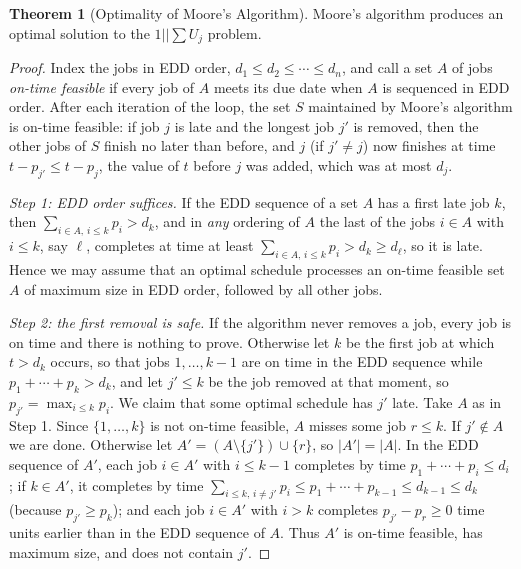 \documentclass{article}
\theoremstyle{definition}
\newtheorem{theorem}{Theorem}
\begin{document}
\begin{theorem}[Optimality of Moore's Algorithm]
Moore's algorithm produces an optimal solution to the $1||\sum U_j$ problem.
\begin{proof}
Index the jobs in EDD order, $d_1 \leq d_2 \leq \cdots \leq d_n$, and call a set $A$ of jobs \emph{on-time feasible} if every job of $A$ meets its due date when $A$ is sequenced in EDD order. After each iteration of the loop, the set $S$ maintained by Moore's algorithm is on-time feasible: if job $j$ is late and the longest job $j'$ is removed, then the other jobs of $S$ finish no later than before, and $j$ (if $j' \neq j$) now finishes at time $t - p_{j'} \leq t - p_j$, the value of $t$ before $j$ was added, which was at most $d_j$.

\emph{Step 1: EDD order suffices.} If the EDD sequence of a set $A$ has a first late job $k$, then $\sum_{i \in A,\, i \leq k} p_i > d_k$, and in \emph{any} ordering of $A$ the last of the jobs $i \in A$ with $i \leq k$, say $\ell$, completes at time at least $\sum_{i \in A,\, i \leq k} p_i > d_k \geq d_\ell$, so it is late. Hence we may assume that an optimal schedule processes an on-time feasible set $A$ of maximum size in EDD order, followed by all other jobs.

\emph{Step 2: the first removal is safe.} If the algorithm never removes a job, every job is on time and there is nothing to prove. Otherwise let $k$ be the first job at which $t > d_k$ occurs, so that jobs $1, \ldots, k-1$ are on time in the EDD sequence while $p_1 + \cdots + p_k > d_k$, and let $j' \leq k$ be the job removed at that moment, so $p_{j'} = \max_{i \leq k} p_i$. We claim that some optimal schedule has $j'$ late. Take $A$ as in Step 1. Since $\{1, \ldots, k\}$ is not on-time feasible, $A$ misses some job $r \leq k$. If $j' \notin A$ we are done. Otherwise let $A' = (A \setminus \{j'\}) \cup \{r\}$, so $|A'| = |A|$. In the EDD sequence of $A'$, each job $i \in A'$ with $i \leq k-1$ completes by time $p_1 + \cdots + p_i \leq d_i$; if $k \in A'$, it completes by time $\sum_{i \leq k,\, i \neq j'} p_i \leq p_1 + \cdots + p_{k-1} \leq d_{k-1} \leq d_k$ (because $p_{j'} \geq p_k$); and each job $i \in A'$ with $i > k$ completes $p_{j'} - p_r \geq 0$ time units earlier than in the EDD sequence of $A$. Thus $A'$ is on-time feasible, has maximum size, and does not contain $j'$.


\end{proof}
\end{theorem}
\end{document}
